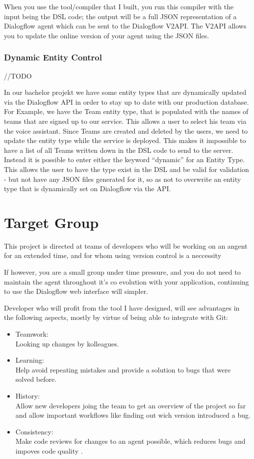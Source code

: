 When you use the tool/compiler that I built, you run this compiler with the input being the DSL code; the output will be a full JSON representation of a Dialogflow agent which can be sent to the Dialogflow V2API.
The V2API allows you to update the online version of your agent using the JSON files.

\subsubsection{Dynamic Entity Control}
//TODO

In our bachelor projekt we have some entity types that are dynamically updated via the Dialogflow API in order to stay up to date with our production database. For Example, we have the Team entity type, that is populated with the names of teams that are signed up to our service. This allows a user to select his team via the voice assistant.
Since Teams are created and deleted by the users, we need to update the entity type while the service is deployed.
This makes it impossible to have a list of all Teams written down in the DSL code to send to the server. 
Instead it is possible to enter either the keyword “dynamic” for an Entity Type.
This allows the user to have the type exist in the DSL and be valid for validation - but not have any JSON files generated for it, so as not to overwrite an entity type that is dynamically set on Dialogflow via the API.

\section{Target Group}

This project is directed at teams of developers who will be working on an angent for an extended time, and for whom using version control is a neccessity

If however, you are a small group under time pressure, and you do not need to maintain the agent throughout it's co evolution with your application, continuing to use the Dialogflow web interface will simpler.

Developer who will profit from the tool I have designed, will see advantages in the following aspects, mostly by virtue of being able to integrate with Git:
\begin{itemize}
    \item Teamwork: \\ Looking up changes by kolleagues.
    \item Learning: \\ Help avoid repeating mistakes and provide a solution to bugs that were solved before.
    \item History: \\ Allow new developers joing the team to get an overview of the project so far and allow important workflows like finding out wich version introduced a bug.
    \item Consistency: \\ Make code reviews for changes to an agent possible, which reduces bugs and impoves code quality \citeNeeded.
\end{itemize}

